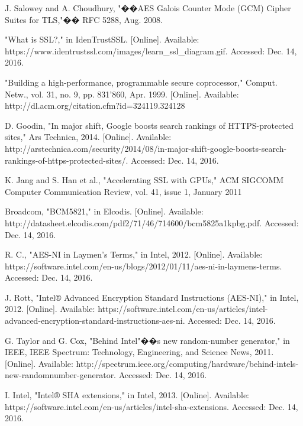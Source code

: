 \documentclass[journal]{IEEEtran}
\begin{document}
\begin{thebibliography}{1}
J. Salowey and A. Choudhury, "��AES Galois Counter Mode (GCM) Cipher Suites for TLS,"�� RFC 5288, Aug. 2008.

"What is SSL?," in IdenTrustSSL. [Online]. Available: https://www.identrustssl.com/images/learn\_ssl\_diagram.gif. Accessed: Dec. 14, 2016.

"Building a high-performance, programmable secure coprocessor," Comput.
Netw., vol. 31, no. 9, pp. 831'860, Apr. 1999. [Online]. Available:
http://dl.acm.org/citation.cfm?id=324119.324128

D. Goodin, "In major shift, Google boosts search rankings of HTTPS-protected sites," Ars Technica, 2014. [Online]. Available: http://arstechnica.com/security/2014/08/in-major-shift-google-boosts-search-rankings-of-https-protected-sites/. Accessed: Dec. 14, 2016.

K. Jang and S. Han et al., "Accelerating SSL with GPUs," ACM
SIGCOMM Computer Communication Review, vol. 41, issue 1,
January 2011

Broadcom, "BCM5821," in Elcodis. [Online]. Available: http://datasheet.elcodis.com/pdf2/71/46/714600/bcm5825a1kpbg.pdf. Accessed: Dec. 14, 2016.

R. C., "AES-NI in Laymen's Terms," in Intel, 2012. [Online]. Available: https://software.intel.com/en-us/blogs/2012/01/11/aes-ni-in-laymens-terms. Accessed: Dec. 14, 2016.

J. Rott, "Intel® Advanced Encryption Standard Instructions (AES-NI)," in Intel, 2012. [Online]. Available: https://software.intel.com/en-us/articles/intel-advanced-encryption-standard-instructions-aes-ni. Accessed: Dec. 14, 2016.

G. Taylor and G. Cox, "Behind Intel"��s new random-number generator," in IEEE, IEEE Spectrum: Technology, Engineering, and Science News, 2011. [Online]. Available: http://spectrum.ieee.org/computing/hardware/behind-intels-new-randomnumber-generator. Accessed: Dec. 14, 2016.

I. Intel, "Intel® SHA extensions," in Intel, 2013. [Online]. Available: https://software.intel.com/en-us/articles/intel-sha-extensions. Accessed: Dec. 14, 2016.

\end{thebibliography}


\end{document}
